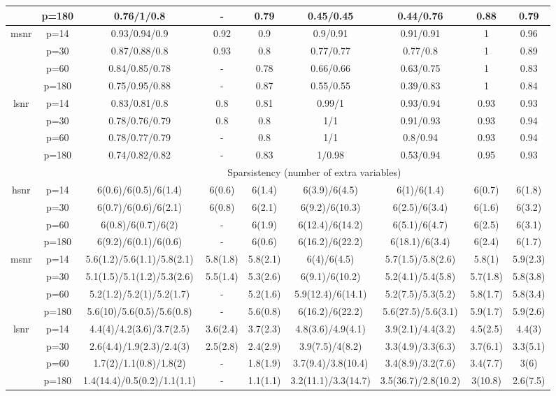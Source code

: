 \begin{table}[ht]
{\begin{tabular}{|c|c|ccccccc|}
   & p=180 & 0.76/1/0.8 & - & 0.79 & 0.45/0.45 & 0.44/0.76 & 0.88 & 0.79 \\ 
  \midrule\multirow{4}[2]{*}{msnr} & p=14 & 0.93/0.94/0.9 & 0.92 & 0.9 & 0.9/0.91 & 0.91/0.91 & 1 & 0.96 \\ 
   & p=30 & 0.87/0.88/0.8 & 0.93 & 0.8 & 0.77/0.77 & 0.77/0.8 & 1 & 0.89 \\ 
   & p=60 & 0.84/0.85/0.78 & - & 0.78 & 0.66/0.66 & 0.63/0.75 & 1 & 0.83 \\ 
   & p=180 & 0.75/0.95/0.88 & - & 0.87 & 0.55/0.55 & 0.39/0.83 & 1 & 0.84 \\ 
  \midrule\multirow{4}[2]{*}{lsnr} & p=14 & 0.83/0.81/0.8 & 0.8 & 0.81 & 0.99/1 & 0.93/0.94 & 0.93 & 0.93 \\ 
   & p=30 & 0.78/0.76/0.79 & 0.8 & 0.8 & 1/1 & 0.91/0.93 & 0.93 & 0.94 \\ 
   & p=60 & 0.78/0.77/0.79 & - & 0.8 & 1/1 & 0.8/0.94 & 0.93 & 0.94 \\ 
   & p=180 & 0.74/0.82/0.82 & - & 0.83 & 1/0.98 & 0.53/0.94 & 0.95 & 0.93 \\ 
   \midrule 
 \multicolumn{1}{|c}{} &       & \multicolumn{7}{c|}{Sparsistency (number of extra variables)} \\
\midrule\multirow{4}[2]{*}{hsnr} & p=14 & 6(0.6)/6(0.5)/6(1.4) & 6(0.6) & 6(1.4) & 6(3.9)/6(4.5) & 6(1)/6(1.4) & 6(0.7) & 6(1.8) \\ 
   & p=30 & 6(0.7)/6(0.6)/6(2.1) & 6(0.8) & 6(2.1) & 6(9.2)/6(10.3) & 6(2.5)/6(3.4) & 6(1.6) & 6(3.2) \\ 
   & p=60 & 6(0.8)/6(0.7)/6(2) & - & 6(1.9) & 6(12.4)/6(14.2) & 6(5.1)/6(4.7) & 6(2.5) & 6(3.1) \\ 
   & p=180 & 6(9.2)/6(0.1)/6(0.6) & - & 6(0.6) & 6(16.2)/6(22.2) & 6(18.1)/6(3.4) & 6(2.4) & 6(1.7) \\ 
  \midrule\multirow{4}[2]{*}{msnr} & p=14 & 5.6(1.2)/5.6(1.1)/5.8(2.1) & 5.8(1.8) & 5.8(2.1) & 6(4)/6(4.5) & 5.7(1.5)/5.8(2.6) & 5.8(1) & 5.9(2.3) \\ 
   & p=30 & 5.1(1.5)/5.1(1.2)/5.3(2.6) & 5.5(1.4) & 5.3(2.6) & 6(9.1)/6(10.2) & 5.2(4.1)/5.4(5.8) & 5.7(1.8) & 5.8(3.8) \\ 
   & p=60 & 5.2(1.2)/5.2(1)/5.2(1.7) & - & 5.2(1.6) & 5.9(12.4)/6(14.1) & 5.2(7.5)/5.3(5.2) & 5.8(1.7) & 5.8(3.4) \\ 
   & p=180 & 5.6(10)/5.6(0.5)/5.6(0.8) & - & 5.6(0.8) & 6(16.2)/6(22.2) & 5.6(27.5)/5.6(3.1) & 5.9(1.7) & 5.9(2.6) \\ 
  \midrule\multirow{4}[2]{*}{lsnr} & p=14 & 4.4(4)/4.2(3.6)/3.7(2.5) & 3.6(2.4) & 3.7(2.3) & 4.8(3.6)/4.9(4.1) & 3.9(2.1)/4.4(3.2) & 4.5(2.5) & 4.4(3) \\ 
   & p=30 & 2.6(4.4)/1.9(2.3)/2.4(3) & 2.5(2.8) & 2.4(2.9) & 3.9(7.5)/4(8.2) & 3.3(4.9)/3.3(6.3) & 3.7(6.1) & 3.3(5.1) \\ 
   & p=60 & 1.7(2)/1.1(0.8)/1.8(2) & - & 1.8(1.9) & 3.7(9.4)/3.8(10.4) & 3.4(8.9)/3.2(7.6) & 3.4(7.7) & 3(6) \\ 
   & p=180 & 1.4(14.4)/0.5(0.2)/1.1(1.1) & - & 1.1(1.1) & 3.2(11.1)/3.3(14.7) & 3.5(36.7)/2.8(10.2) & 3(10.8) & 2.6(7.5) \\ 
   \bottomrule 
\end{tabular}
}
\end{table}
